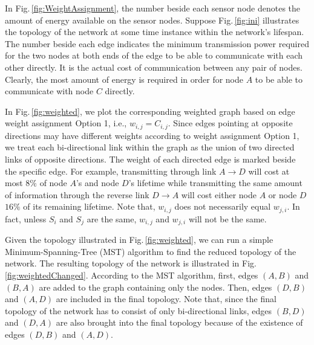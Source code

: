 \documentclass[journal,12pt,onecolumn]{IEEEtran}
\begin{document}
In Fig.\,\ref{fig:WeightAssignment}, the number beside each sensor
node denotes the amount of energy available on the sensor nodes.
Suppose Fig.\,\ref{fig:ini} illustrates the topology of the network
at some time instance within the network's lifespan. The number beside each edge indicates the
minimum transmission power required for the two nodes at both ends
of the edge to be able to communicate with each other directly. It is the actual cost of communication
between any pair of nodes. Clearly, the most amount of energy is required in order for node $A$
to be able to communicate with node $C$ directly.







In Fig.\,\ref{fig:weighted}, we plot the corresponding weighted
graph based on edge weight assignment Option 1, i.e., $w_{i,j}=C_{i,j}$. Since edges pointing at
opposite directions may have different weights according to weight
assignment Option 1, we treat each bi-directional link
within the graph as the union of two directed links of opposite
directions. The weight of each directed edge is marked beside the
specific edge. For example, transmitting through link $A\rightarrow D$
will cost at most $8\%$ of node $A$'s and node $D$'s lifetime while
transmitting the same amount of information through the reverse link
$D\rightarrow A$ will cost either node $A$ or node $D$ $16\%$ of its
remaining lifetime. Note that, $w_{i,j}$ does not necessarily equal
$w_{j,i}$. In fact, unless $S_i$ and $S_j$ are the same, $w_{i,j}$ and $w_{j,i}$ will not
be the same.


Given the topology illustrated in Fig.\,\ref{fig:weighted}, we can
run a simple Minimum-Spanning-Tree (MST) algorithm to find the
reduced topology of the network. The resulting topology of the
network is illustrated in Fig.\,\,\ref{fig:weightedChanged}.
According to the MST algorithm, first, edges $(A,B)$ and $(B,A)$ are
added to the graph containing only the nodes. Then, edges $(D,B)$ and
$(A,D)$ are included in the final topology. Note that, since the final
topology of the network has to consist of only bi-directional links,
edges $(B,D)$ and $(D,A)$ are also brought into the final topology
because of the existence of edges $(D,B)$ and $(A,D)$.
\end{document}
